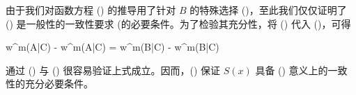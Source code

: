 由于我们对函数方程 (\in[2-45]) 的推导用了针对 $B$ 的特殊选择 (\in[2-41])，至此我们仅仅证明了 (\in[2-58]) 是一般性的一致性要求 (\in[2-40] 的必要条件。为了检验其充分性，将 (\in[2-58]) 代入 (\in[2-40])，可得

\placeformula[2-58]
\startformula
w^m(A|C) - w^m(A|C) = w^m(B|C) - w^m(B|C)
\stopformula

通过 (\in[2-28]) 与 (\in[2-38]) 很容易验证上式成立。因而，(\in[2-58]) 保证 $S(x)$ 具备 (\in[2-40]) 意义上的一致性的充分必要条件。
